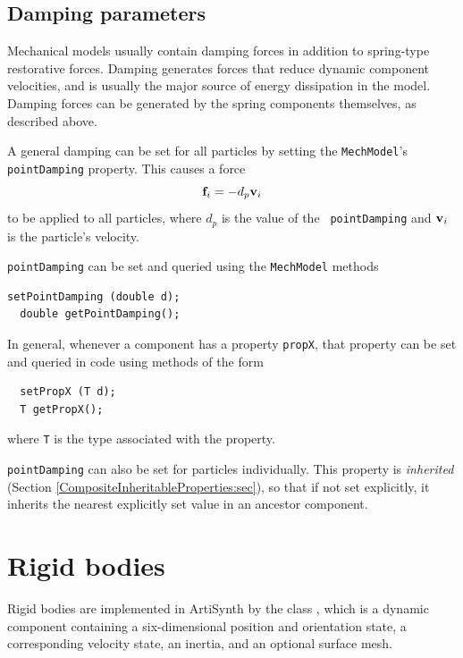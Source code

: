 \subsection{Damping parameters}

Mechanical models usually contain damping forces in addition to
spring-type restorative forces. Damping generates forces that reduce
dynamic component velocities, and is usually the major source of
energy dissipation in the model. Damping forces can be generated by
the spring components themselves, as described above.

A general damping can be set for all particles by setting the
{\tt MechModel}'s {\tt pointDamping} property. This causes
a force
%
\begin{equation}
{\bf f}_i = -d_p {\bf v}_i \label{eqn:pointdamping}
\end{equation}
%
to be applied to all particles, where $d_p$ is the value of the {\tt
pointDamping} and ${\bf v}_i$ is the particle's velocity.

{\tt pointDamping} can be set and queried using the {\tt MechModel}
methods
%
\begin{lstlisting}[]
  setPointDamping (double d);
  double getPointDamping();
\end{lstlisting}
%

\begin{sideblock}
In general, whenever a component has a property {\tt propX}, that
property can be set and queried in code using methods of the form
\begin{verbatim}
  setPropX (T d);
  T getPropX();
\end{verbatim}
where {\tt T} is the type associated with the property.
\end{sideblock}

{\tt pointDamping} can also be set for particles individually.  This
property is {\it inherited} (Section
\ref{CompositeInheritableProperties:sec}), so that if not set
explicitly, it inherits the nearest explicitly set value in an
ancestor component.

\section{Rigid bodies}

Rigid bodies are implemented in ArtiSynth by the class
, which is a dynamic
component containing a six-dimensional position and orientation state,
a corresponding velocity state, an inertia, and an optional surface
mesh.

